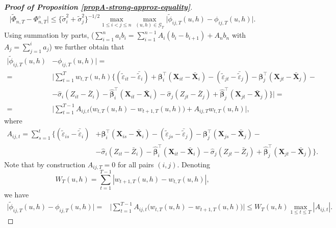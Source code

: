\begin{proof}[\textnormal{\textbf{Proof of Proposition \ref{propA-strong-approx-equality}}}]
\begin{align}\label{eq-strongapprox-bound2}
\big| \widetilde{\Phi}_{n, T} - \Phi_{n, T}^{\diamond} \big| \le \{\widetilde{\sigma}_i^2 + \widetilde{\sigma}_j^2 \}^{-1/2} \max_{1\le i < j \le n} \max_{(u,h) \in \mathcal{G}_T} \big| \widetilde{\phi}_{ij, T}(u,h) - \phi_{ij, T}(u,h) \big|.
\end{align}
Using summation by parts,
($\sum_{i=1}^n a_i b_i = \sum_{i=1}^{n-1} A_i (b_i - b_{i+1}) + A_n b_n$ with $A_j = \sum_{j=1}^i a_j$) 
we further obtain that 
\begin{align*}
\big| \widetilde{\phi}_{ij, T}(u,h) &- \phi_{ij, T}(u,h) \big| = \\
=&\bigg|\sum_{t=1}^T w_{t,T}(u,h) \big\{ (\widetilde{\varepsilon}_{it} - \bar{\widetilde{\varepsilon}}_i) + \bm{\beta}_i^\top (\mathbf{X}_{it} - \bar{\mathbf{X}}_{i}) - (\widetilde{\varepsilon}_{jt} - \bar{\widetilde{\varepsilon}}_j) -\bm{\beta}_j^\top (\mathbf{X}_{jt} - \bar{\mathbf{X}}_{j}) -\\
&-\widehat{\sigma}_i (Z_{it} - \bar{Z}_i) - \widehat{\bm{\beta}}_i^\top (\mathbf{X}_{it} - \bar{\mathbf{X}}_{i}) - \widehat{\sigma}_j (Z_{jt} - \bar{Z}_j) + \widehat{\bm{\beta}}_j^\top (\mathbf{X}_{jt} - \bar{\mathbf{X}}_{j}) \big\}\bigg| = \\
=&\Big|\sum_{t=1}^{T-1} A_{ij, t} \big(w_{t,T}(u,h) -w_{t+1,T}(u,h)\big) + A_{ij, T} w_{t,T}(u,h)\Big|,
\end{align*}
where 
\begin{align*}
A_{ij, t} = \sum_{s=1}^t \big\{ (\widetilde{\varepsilon}_{is} - \bar{\widetilde{\varepsilon}}_i) &+ \bm{\beta}_i^\top (\mathbf{X}_{is} - \bar{\mathbf{X}}_{i}) - (\widetilde{\varepsilon}_{js} - \bar{\widetilde{\varepsilon}}_j) -\bm{\beta}_j^\top (\mathbf{X}_{js} - \bar{\mathbf{X}}_{j}) - \\
&-\widehat{\sigma}_i (Z_{it} - \bar{Z}_i) - \widehat{\bm{\beta}}_i^\top (\mathbf{X}_{it} - \bar{\mathbf{X}}_{i}) - \widehat{\sigma}_j (Z_{jt} - \bar{Z}_j) + \widehat{\bm{\beta}}_j^\top (\mathbf{X}_{jt} - \bar{\mathbf{X}}_{j}) \big\}.
\end{align*}
Note that by construction $A_{ij, T} = 0$ for all pairs $(i, j)$. Denoting 
\[ W_T(u,h) = \sum\limits_{t=1}^{T-1} |w_{t+1,T}(u,h) - w_{t,T}(u,h)|,\]
we have 
\begin{align}\label{eq-strongapprox-bound3}
\big| \widetilde{\phi}_{ij, T}(u,h) - \phi_{ij, T}(u,h) \big| =& \Big|\sum_{t=1}^{T-1} A_{ij, t} \big(w_{t,T}(u,h) -w_{t+1,T}(u,h)\big)\Big|\le W_T(u, h)\max_{1 \le t \le T} |A_{ij, t}|.
\end{align}

\end{proof}
